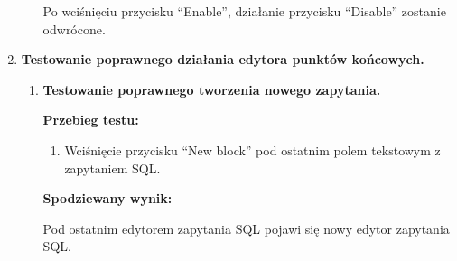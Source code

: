 \begin{enumerate}
\begin{enumerate}
                Po wciśnięciu przycisku ``Enable'', działanie przycisku
                ``Disable'' zostanie odwrócone.

        \end{enumerate}

    \item \textbf{Testowanie poprawnego działania edytora punktów końcowych.}

        \begin{enumerate}

            \item \textbf{Testowanie poprawnego tworzenia nowego zapytania.}

                \textbf{Przebieg testu:}

                \begin{enumerate}

                    \item Wciśnięcie przycisku ``New block'' pod ostatnim
                        polem tekstowym z zapytaniem SQL.

                \end{enumerate}

                \textbf{Spodziewany wynik:}

                Pod ostatnim edytorem zapytania SQL pojawi się nowy edytor
                zapytania SQL.

        \end{enumerate}

\end{enumerate}
